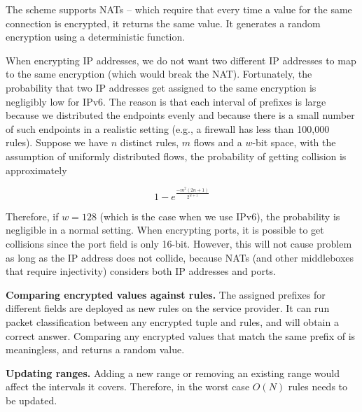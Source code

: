 The scheme supports NATs -- which require that every time a value for the same connection is encrypted, it returns the same value. It generates a random encryption using a deterministic function. 

When encrypting IP addresses, we do not want two different IP addresses to map to the same encryption (which would break the NAT). Fortunately, the probability that two IP addresses get assigned to the same encryption is negligibly low for IPv6.  The reason is that each interval of prefixes is large because we distributed the endpoints evenly and because there is a small number of such endpoints in a realistic setting (e.g., a firewall has less than 100,000 rules). Suppose we have $n$ distinct rules, $m$ flows and a $w$-bit space, with the assumption of uniformly distributed flows, the probability of getting collision is approximately 

\begin{equation}
1 - e^\frac{-m^2 (2n+1)}{2^{w+1}}
\end{equation}

Therefore, if $w=128$ (which is the case when we use IPv6), the probability is negligible in a normal setting. When encrypting ports, it is possible to get collisions since the port field is only 16-bit. However, this will not cause problem as long as the IP address does not collide, because NATs (and other middleboxes that require injectivity) considers both IP addresses and ports.



\noindent \textbf{Comparing encrypted values against rules.}
The assigned prefixes for different fields are deployed as new rules on the service provider. It can run packet classification between any encrypted tuple and rules, and will obtain a correct answer. Comparing any encrypted values that match the same prefix of is meaningless, and returns a random value.

\noindent \textbf{Updating ranges.}
Adding a new range or removing an existing range would affect the intervals it covers. Therefore, in the worst case $O(N)$ rules needs to be updated. 

